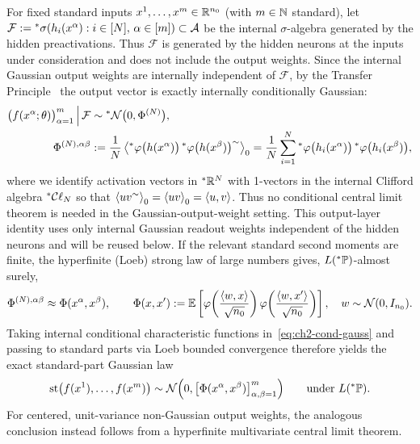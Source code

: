 For fixed standard inputs $x^1, \dots, x^m \in \mathbb{R}^{n_0}$ (with $m \in \mathbb{N}$ standard), let $\mathcal{F} := {}^*\sigma(h_i(x^\alpha) : i \in [N],\, \alpha \in [m]) \subset \mathcal{A}$ be the internal $\sigma$-algebra generated by the hidden preactivations. Thus $\mathcal{F}$ is generated by the hidden neurons at the inputs under consideration and does not include the output weights. Since the internal Gaussian output weights are internally independent of $\mathcal{F}$, by the Transfer Principle~\cite{robinson1966nonstandard} the output vector is exactly internally conditionally Gaussian:
\begin{equation}\label{eq:ch2-cond-gauss}
\begin{aligned}
\bigl(f(x^\alpha; \theta)\bigr)_{\alpha=1}^{m} \,\Big|\, \mathcal{F} &\sim {}^*\mathcal{N}\bigl(0, \Phi^{(N)}\bigr), \\
\Phi^{(N),\alpha\beta} &:= \frac{1}{N} \left\langle {}^*\varphi\bigl(h(x^\alpha)\bigr)\,{}^*\varphi\bigl(h(x^\beta)\bigr)^{\sim} \right\rangle_0 = \frac{1}{N} \sum_{i=1}^{N} {}^*\varphi\bigl(h_i(x^\alpha)\bigr) \, {}^*\varphi\bigl(h_i(x^\beta)\bigr),
\end{aligned}
\end{equation}
where we identify activation vectors in ${}^*\mathbb{R}^N$ with 1-vectors in the internal Clifford algebra ${}^*\mathcal{C}\ell_N$ so that $\left\langle u v^{\sim} \right\rangle_0 = \left\langle u v \right\rangle_0 = \left\langle u, v \right\rangle$. Thus no conditional central limit theorem is needed in the Gaussian-output-weight setting. This output-layer identity uses only internal Gaussian readout weights independent of the hidden neurons and will be reused below. If the relevant standard second moments are finite, the hyperfinite (Loeb) strong law of large numbers gives, $L({}^*\mathbb{P})$-almost surely,
\begin{equation}\label{eq:ch2-slln-phi}
\Phi^{(N),\alpha\beta} \approx \Phi(x^\alpha, x^\beta), \qquad
\Phi(x, x') := \mathbb{E}\left[ \varphi\!\left(\frac{\left\langle w, x \right\rangle}{\sqrt{n_0}}\right) \varphi\!\left(\frac{\left\langle w, x' \right\rangle}{\sqrt{n_0}}\right) \right], \quad w \sim \mathcal{N}(0, I_{n_0}).
\end{equation}
Taking internal conditional characteristic functions in~\eqref{eq:ch2-cond-gauss} and passing to standard parts via Loeb bounded convergence therefore yields the exact standard-part Gaussian law
\begin{equation}\label{eq:ch2-f-shadow-law}
\operatorname{st}\bigl(f(x^1), \dots, f(x^m)\bigr) \sim \mathcal{N}\Bigl(0, \bigl[\Phi(x^\alpha, x^\beta)\bigr]_{\alpha,\beta=1}^{m}\Bigr) \qquad \text{under } L({}^*\mathbb{P}).
\end{equation}
For centered, unit-variance non-Gaussian output weights, the analogous conclusion instead follows from a hyperfinite multivariate central limit theorem.

